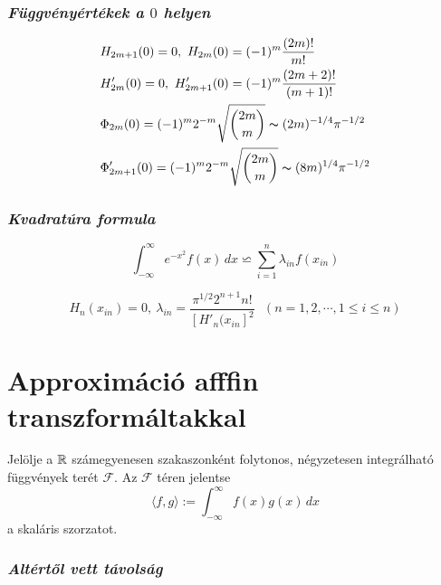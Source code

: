\documentclass[oneside,titlepage,12pt,a4paper]{report}
\begin{document}
\subsubsection{\it  Függvényértékek a $0$ helyen}
\begin{equation}
\begin{split}
&H_{2m+1}(0)=0,\ H_{2m}(0)=(-1)^m\frac{(2m)!}{m!}\\
&H'_{2m}(0)=0,\ H'_{2m+1}(0)=(-1)^m\frac{(2m+2)!}{(m+1)!}\\
&\Phi_{2m}(0)=(-1)^m2^{-m}\sqrt{\binom {2m}m}\thicksim (2 m)^{-1/4}\pi^{-1/2}\\
&\Phi'_{2m+1}(0)=(-1)^m2^{-m}\sqrt{\binom {2m}m}\thicksim (8m)^{1/4}\pi^{-1/2}
\end{split}
\end{equation}

\subsubsection{\it Kvadratúra formula}
$$
\int_{-\infty}^\infty e^{-x^2}f(x)\, dx\backsimeq \sum_{i=1}^n \lambda_{in}f(x_{in})
$$

$$
H_n(x_{in})=0,\ \lambda_{in}=\frac{\pi^{1/2}2^{n+1}n!}{[H'_n(x_{in}]^2}\ \ \  (n=1,2,\cdots, 1\le i\le n)
$$

\section{Approximáció afffin transzformáltakkal}
\label{app:aprx}

Jelölje a $\Bbb R$ számegyenesen szakaszonként folytonos, négyzetesen integrálható függvények terét $\mathcal F$. Az $\mathcal F$ téren jelentse
$$
\langle f,g\rangle:=\int_{-\infty}^\infty  f(x)g(x)\,dx
$$
a skaláris szorzatot.


\subsubsection{\it  Altértől vett távolság}
\end{document}
